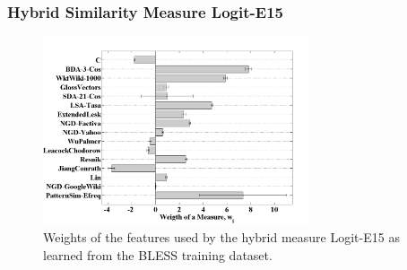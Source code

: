 \documentclass{beamer}
\begin{document}
\begin{frame}
 \frametitle{Hybrid Similarity Measure Logit-E15}
	\begin{figure}
	\centering
		\includegraphics[width=0.7\textwidth]{figures/logit-e15-bless-errorbars}
		\caption{Weights of the features used by the hybrid measure Logit-E15 as learned from the BLESS training dataset. }
\end{figure}
	
\end{frame}
\end{document}
